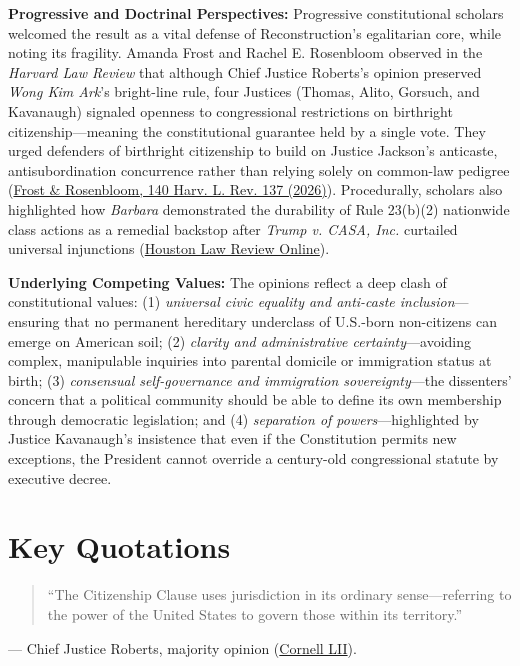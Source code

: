 \documentclass[12pt]{article}
\begin{document}
\textbf{Progressive and Doctrinal Perspectives:} Progressive constitutional scholars welcomed the result as a vital defense of Reconstruction's egalitarian core, while noting its fragility. Amanda Frost and Rachel E. Rosenbloom observed in the \textit{Harvard Law Review} that although Chief Justice Roberts's opinion preserved \textit{Wong Kim Ark}'s bright-line rule, four Justices (Thomas, Alito, Gorsuch, and Kavanaugh) signaled openness to congressional restrictions on birthright citizenship---meaning the constitutional guarantee held by a single vote. They urged defenders of birthright citizenship to build on Justice Jackson's anticaste, antisubordination concurrence rather than relying solely on common-law pedigree (\href{https://www.law.virginia.edu/node/2211356}{Frost \& Rosenbloom, 140 Harv. L. Rev. 137 (2026)}). Procedurally, scholars also highlighted how \textit{Barbara} demonstrated the durability of Rule 23(b)(2) nationwide class actions as a remedial backstop after \textit{Trump v. CASA, Inc.} curtailed universal injunctions (\href{https://houstonlawreview.org/article/171991-from-universal-injunctions-to-nationwide-classes-what-_barbara-v-trump_-reveals-about-_casa_-s-remedial-framework.pdf}{Houston Law Review Online}).

\textbf{Underlying Competing Values:} The opinions reflect a deep clash of constitutional values: (1) \textit{universal civic equality and anti-caste inclusion}---ensuring that no permanent hereditary underclass of U.S.-born non-citizens can emerge on American soil; (2) \textit{clarity and administrative certainty}---avoiding complex, manipulable inquiries into parental domicile or immigration status at birth; (3) \textit{consensual self-governance and immigration sovereignty}---the dissenters' concern that a political community should be able to define its own membership through democratic legislation; and (4) \textit{separation of powers}---highlighted by Justice Kavanaugh's insistence that even if the Constitution permits new exceptions, the President cannot override a century-old congressional statute by executive decree.

\section{Key Quotations}
\begin{quote}
``The Citizenship Clause uses jurisdiction in its ordinary sense---referring to the power of the United States to govern those within its territory.''
\end{quote}
\noindent --- Chief Justice Roberts, majority opinion (\href{https://www.law.cornell.edu/supremecourt/text/25-365}{Cornell LII}).
\end{document}
